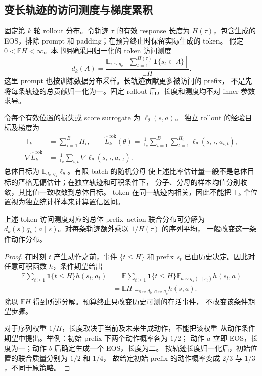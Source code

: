 \subsection{变长轨迹的访问测度与梯度累积}
\label{sec:prefix-measure-reduction}

固定第 $k$ 轮 rollout 分布。令轨迹 $\tau$ 的有效 response 长度为
$H(\tau)$，包含生成的 EOS，排除 prompt 和 padding；在预算终止时保留实际生成的 token。
假定 $0<\mathbb E H<\infty$。本书明确采用归一化的 token 访问测度
\begin{equation}
 d_k(A)=\frac{\mathbb E_{\tau\sim q_k}
 [\sum_{t=1}^{H(\tau)}\mathbf1\{s_t\in A\}]}{\mathbb E H}.
\end{equation}
这里 prompt 也按训练数据分布采样。长轨迹贡献更多被访问的 prefix，
不是先将每条轨迹的总贡献归一化为一。固定 rollout 后，长度和测度均不对 inner 参数求导。

令每个有效位置的损失或 score surrogate 为 $\ell_\theta(s,a)$。
独立 rollout 的经验目标及梯度为
\begin{align}
 \mathsf T_k&=\sum_{i=1}^{B}H_i,\qquad
 \widehat L_k^{\mathrm{tok}}(\theta)
 =\frac1{\mathsf T_k}\sum_{i=1}^{B}\sum_{t=1}^{H_i}
 \ell_\theta(s_{i,t},a_{i,t}),\\
 \nabla\widehat L_k^{\mathrm{tok}}
 &=\frac1{\mathsf T_k}\sum_{i,t}\nabla\ell_\theta(s_{i,t},a_{i,t}).
\end{align}
总体目标为 $\mathbb E_{d_k, q_k}\ell_\theta$。有限 batch 的随机分母
使上述比率估计量一般不是总体目标的严格无偏估计；在独立轨迹和可积条件下，
分子、分母的样本均值分别收敛，其比值一致收敛到总体目标。
token 在同一轨迹内相关，因此不能把 $\mathsf T_k$ 个位置视为独立统计样本来计算置信区间。

\begin{proposition}[访问测度与条件动作分布]
上述 token 访问测度对应的总体 prefix--action 联合分布可分解为
$d_k(s) q_k(a\mid s)$。对每条轨迹额外乘以 $1/H(\tau)$ 的序列平均，
一般改变这一条件动作分布。
\end{proposition}
\begin{proof}
在时刻 $t$ 产生动作之前，事件 $\{t\le H\}$ 和 prefix $s_t$
已由历史决定。因此对任意可积函数 $h$，条件期望给出
\begin{align}
 \mathbb E\sum_{t\ge1}\mathbf1\{t\le H\}h(s_t,a_t)
 &=\mathbb E\sum_{t\ge1}\mathbf1\{t\le H\}
 \mathbb E_{a\sim q_k(\cdot\mid s_t)}h(s_t,a)\\
 &=\mathbb E H\;\mathbb E_{s\sim d_k,a\sim q_k}h(s,a).
\end{align}
除以 $\mathbb E H$ 得到所述分解。预算终止只改变历史可测的存活事件，
不改变该条件期望步骤。

对于序列权重 $1/H$，长度取决于当前及未来生成动作，不能把该权重
从动作条件期望中提出。举例：初始 prefix 下两个动作概率各为 $1/2$；
动作 $a$ 立即 EOS，长度为一；动作 $b$ 后确定生成一个 EOS，长度为二。
按轨迹长度归一化后，初始位置的联合质量分别为 $1/2$ 和 $1/4$，
故给定初始 prefix 的动作概率变成 $2/3$ 与 $1/3$，不同于原策略。
\end{proof}

